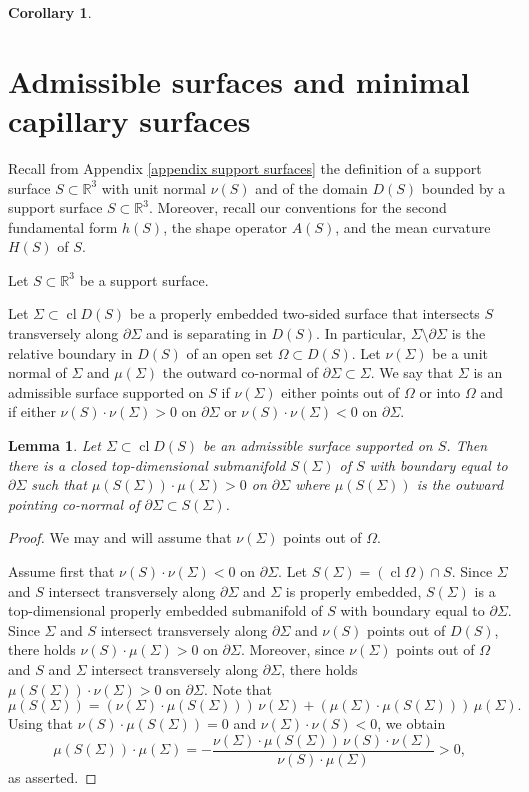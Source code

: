 \documentclass[11pt]{amsart}
\newtheorem{lem}[prop]{Lemma}
\newtheorem{coro}[prop]{Corollary}
\begin{document}
\begin{appendices}
\begin{coro}
 	\end{coro}
 	\section{Admissible surfaces and minimal capillary surfaces}
 	
 	\label{appendix minimal capillary surfaces}
 Recall from Appendix \ref{appendix support surfaces} the definition of a support surface $S\subset \mathbb{R}^3$ with unit normal $\nu(S)$ and of the domain $D(S)$ bounded by a support surface $S\subset \mathbb{R}^3$. 	Moreover, recall   our conventions for the second fundamental form $h(S)$, the shape operator $A(S)$, and the mean curvature $H(S)$ of $S$. 
 
 Let $S\subset \mathbb{R}^3$ be a support surface.

Let $\Sigma \subset \operatorname{cl}D(S)$ be a properly embedded two-sided surface that intersects $S$ transversely along $\partial \Sigma$ and is separating in $D(S)$. In particular, $\Sigma\setminus \partial \Sigma$ is the relative boundary in $D(S)$ of an open set $\Omega\subset D(S)$.  Let $\nu(\Sigma)$ be a unit normal of $\Sigma$ and $\mu(\Sigma)$ the outward co-normal of $\partial \Sigma\subset \Sigma$. We say that $\Sigma$ is an admissible surface supported on $S$ if $\nu(\Sigma)$ either points out of $\Omega$ or into $\Omega$ and if either $\nu(S)\cdot \nu(\Sigma)>0$ on $\partial \Sigma$ or $\nu(S)\cdot \nu(\Sigma)<0$ on $\partial \Sigma$.


	\begin{lem} \label{wetting surface}
		Let $\Sigma \subset \operatorname{cl} D(S)$ be an admissible surface supported on $S$. Then there is a closed top-dimensional submanifold $S(\Sigma)$ of $S$ with boundary equal to $\partial \Sigma$ such that $\mu(S(\Sigma))\cdot \mu(\Sigma)>0$ on $\partial \Sigma$ where $\mu(S(\Sigma))$ is the outward pointing co-normal of $\partial \Sigma\subset S(\Sigma)$.
	\end{lem}
	\begin{proof}
We may and will assume that $\nu(\Sigma)$ points out of $\Omega$.

Assume first that $\nu(S)\cdot \nu(\Sigma)<0$ on $\partial \Sigma$. Let $S(\Sigma)=(\operatorname{cl}\Omega) \cap S$. Since $\Sigma$ and $S$ intersect transversely along $\partial \Sigma$ and $\Sigma$ is properly embedded, $S(\Sigma)$ is a top-dimensional properly embedded submanifold of $S$ with boundary equal to $\partial \Sigma$.
 Since $\Sigma$ and $S$ intersect transversely along $\partial \Sigma$ and $\nu(S)$ points out of $D(S)$, there holds $\nu(S)\cdot \mu(\Sigma)>0$ on $\partial \Sigma$.	 Moreover, since $\nu(\Sigma)$ points out of $\Omega$ and $S$ and $\Sigma$ intersect transversely along $\partial \Sigma$, there holds $\mu(S(\Sigma))\cdot \nu(\Sigma)>0$ on $\partial \Sigma$. Note that 
$$
\mu(S(\Sigma))=(\nu(\Sigma)\cdot \mu(S(\Sigma)))\,\nu(\Sigma)+(\mu(\Sigma)\cdot\mu(S(\Sigma)))\,\mu(\Sigma).
$$
Using that $\nu(S)\cdot \mu(S(\Sigma))=0$ and $\nu(\Sigma)\cdot \nu(S)<0$, we obtain
$$
\mu(S(\Sigma))\cdot \mu(\Sigma)=-\frac{\nu(\Sigma)\cdot \mu(S(\Sigma))\,\nu(S)\cdot\nu(\Sigma)}{\nu(S)\cdot \mu(\Sigma)}>0,
$$
as asserted.


\end{proof}
\end{appendices}
\end{document}
